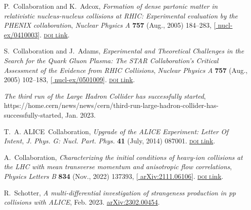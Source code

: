 \documentclass[ALICE,manyauthors]{cernphprep}
\begin{document}
\begin{thebibliography}{100}
P.~Collaboration and K.~Adcox, {\it Formation of dense partonic matter in
  relativistic nucleus-nucleus collisions at {{RHIC}}: {{Experimental}}
  evaluation by the {{PHENIX}} collaboration},  {\textsl{Nuclear Physics A}}
  {\footnotesize \bf 757} (Aug., 2005) 184--283,
  [\href{https://arxiv.org/abs/nucl-ex/0410003}{{\footnotesize
  nucl-ex/0410003}}].
  \href{http://dx.doi.org/10.1016/j.nuclphysa.2005.03.086}{\footnotesize
  \textrm{\textsc{doi l}ink}}.

S.~Collaboration and J.~Adams, {\it Experimental and {{Theoretical Challenges}}
  in the {{Search}} for the {{Quark Gluon Plasma}}: {{The STAR
  Collaboration}}'s {{Critical Assessment}} of the {{Evidence}} from {{RHIC
  Collisions}}},  {\textsl{Nuclear Physics A}} {\footnotesize \bf 757} (Aug.,
  2005) 102--183, [\href{https://arxiv.org/abs/nucl-ex/0501009}{{\footnotesize
  nucl-ex/0501009}}].
  \href{http://dx.doi.org/10.1016/j.nuclphysa.2005.03.085}{\footnotesize
  \textrm{\textsc{doi l}ink}}.

{\it The third run of the {{Large Hadron Collider}} has successfully started},
  https://home.cern/news/news/cern/third-run-large-hadron-collider-has-successfully-started,
  Jan. 2023.

T.~A. ALICE~Collaboration, {\it Upgrade of the {{ALICE Experiment}}: {{Letter
  Of Intent}}},  {\textsl{J. Phys. G: Nucl. Part. Phys.}} {\footnotesize \bf
  41} (July, 2014) 087001.
  \href{http://dx.doi.org/10.1088/0954-3899/41/8/087001}{\footnotesize
  \textrm{\textsc{doi l}ink}}.

A.~Collaboration, {\it Characterizing the initial conditions of heavy-ion
  collisions at the {{LHC}} with mean transverse momentum and anisotropic flow
  correlations},  {\textsl{Physics Letters B}} {\footnotesize \bf 834} (Nov.,
  2022) 137393, [\href{https://arxiv.org/abs/2111.06106}{{\footnotesize
  arXiv:2111.06106}}].
  \href{http://dx.doi.org/10.1016/j.physletb.2022.137393}{\footnotesize
  \textrm{\textsc{doi l}ink}}.

R.~Schotter, {\it A multi-differential investigation of strangeness production
  in pp collisions with {{ALICE}}},  Feb. 2023.
\newblock \href{https://arxiv.org/abs/2302.00454}{{\footnotesize
  arXiv:2302.00454}}.


\end{thebibliography}
\end{document}
